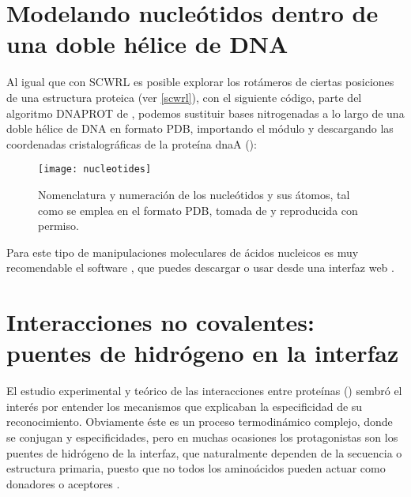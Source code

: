 
\section{Modelando nucle\'{o}tidos dentro de una doble h\'{e}lice de DNA} \label{modelnt}

Al igual que con SCWRL es posible explorar los rot\'{a}meros de ciertas posiciones de una estructura proteica (ver \ref{scwrl}), 
con el siguiente c\'{o}digo, parte del algoritmo DNAPROT de \citet{Espinosa2008}, 
podemos sustituir bases nitrogenadas a lo largo 
de una doble h\'{e}lice de DNA en formato PDB, importando el m\'{o}dulo  y descargando
las coordenadas cristalogr\'{a}ficas de la prote\'{i}na dnaA ():

\begin{figure}
\begin{center} 
\texttt{[image: nucleotides]}
\caption%
{
Nomenclatura y numeraci\'{o}n de los nucle\'{o}tidos y sus \'{a}tomos, tal como se emplea en el formato PDB,
tomada de  y reproducida con permiso.
}
\label{fig:nucleotides}
\end{center}
\end{figure}



Para este tipo de manipulaciones moleculares de \'{a}cidos nucleicos es muy recomendable el software 
, que puedes descargar o usar desde una interfaz web \citep{Lu2008}.


\section{Interacciones no covalentes: puentes de hidr\'{o}geno en la interfaz} \label{Hbonds}

El estudio experimental y te\'{o}rico de las interacciones entre prote\'{i}nas 
()
sembr\'{o} el inter\'{e}s por entender los mecanismos que explicaban la especificidad de su reconocimiento.
Obviamente \'{e}ste es un proceso termodin\'{a}mico complejo, donde se conjugan 
 y especificidades, pero en muchas ocasiones los 
protagonistas son los puentes de hidr\'{o}geno de la interfaz, que naturalmente dependen de la secuencia o estructura primaria, 
puesto que no todos los amino\'{a}cidos pueden actuar como donadores o aceptores \citep{Kortemme2003}.


